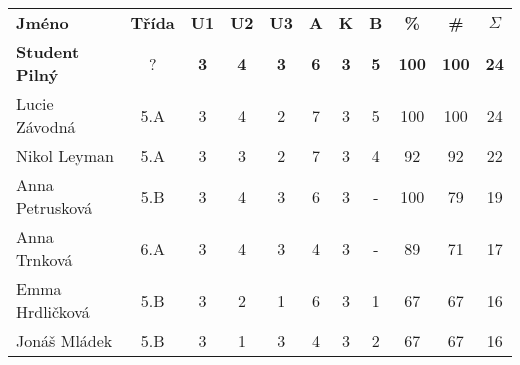 \documentclass{../../../style/mkimain}
\begin{document}
\setlength{\arrayrulewidth}{0.5mm}
\begin{tabular}{ l c c c c c c c|c c c }
    \textbf{Jméno}  & \textbf{Třída} & \textbf{U1} & \textbf{U2} & \textbf{U3} & \textbf{A} & \textbf{K} & \textbf{B} & \textbf{\%}  & \textbf{\#}  & \textbf{$\Sigma$} \\
    \textbf{Student   Pilný} & ?     & \textbf{3}  & \textbf{4}  & \textbf{3}  & \textbf{6} & \textbf{3} & \textbf{5} & \textbf{100} & \textbf{100} & \textbf{24}  \\
    \hline
    Lucie Závodná   & 5.A   & 3 & 4  & 2  & 7 & 3 & 5 & 100 & 100 & 24 \\
    Nikol Leyman    & 5.A   & 3  & 3  & 2  & 7 & 3 & 4 & 92  & 92  & 22 \\
    Anna   Petrusková        & 5.B   & 3  & 4  & 3  & 6 & 3 & - & 100 & 79  & 19 \\
    Anna Trnková    & 6.A   & 3  & 4  & 3  & 4 & 3 & - & 89  & 71  & 17 \\
    Emma   Hrdličková        & 5.B   & 3  & 2  & 1  & 6 & 3 & 1 & 67  & 67  & 16 \\
    Jonáš Mládek    & 5.B   & 3  & 1  & 3  & 4 & 3 & 2 & 67  & 67  & 16 \\
\end{tabular}
\end{document}
